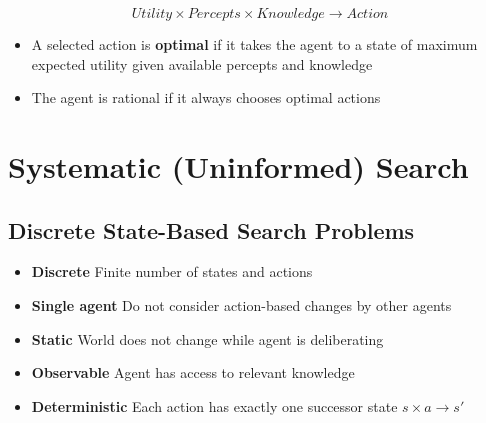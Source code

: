 \documentclass[conference]{styles/acmsiggraph}
\begin{document}
        $$Utility \times Percepts \times Knowledge \longrightarrow Action$$
        
        \begin{itemize}
            \item A selected action is \textbf{optimal} if it takes the agent to a state of maximum expected utility given available percepts and knowledge
            \item The agent is rational if it always chooses optimal actions
        \end{itemize}
        
        
        
        
        
        
        
\section{Systematic (Uninformed) Search}
    
    \subsection{Discrete State-Based Search Problems}
        \begin{itemize}
            \item \textbf{Discrete}\newline
                Finite number of states and actions
            \item \textbf{Single agent}\newline
                Do not consider action-based changes by other agents
            \item \textbf{Static}\newline
                World does not change while agent is deliberating
            \item \textbf{Observable}\newline
                Agent has access to relevant knowledge
            \item \textbf{Deterministic}\newline
                Each action has exactly one successor state $s \times a \longrightarrow s'$
        \end{itemize}
    
\end{document}
